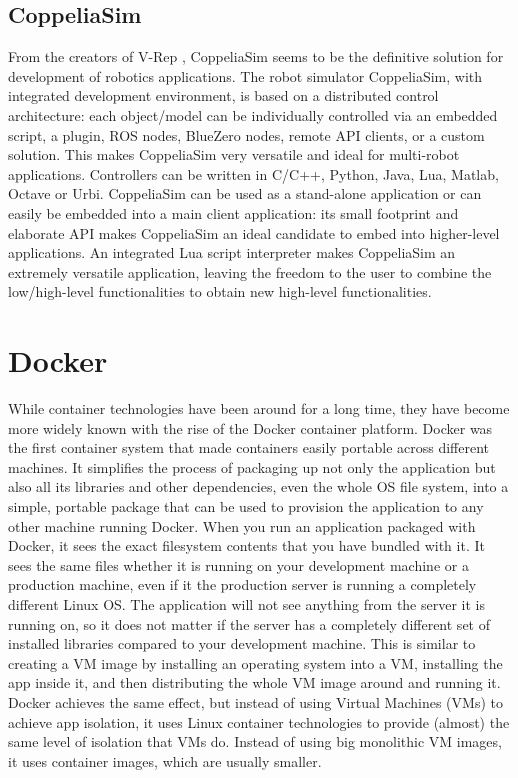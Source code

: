 
\subsection{CoppeliaSim}
From the creators of V-Rep \cite{VREP}, CoppeliaSim \cite{coppeliaSim} seems to be the definitive solution for development of robotics applications.
The robot simulator CoppeliaSim, with integrated development environment, is based on a distributed control architecture: each object/model can be individually controlled via an embedded script, a plugin, ROS nodes, BlueZero nodes, remote API clients, or a custom solution. This makes CoppeliaSim very versatile and ideal for multi-robot applications. Controllers can be written in C/C++, Python, Java, Lua, Matlab, Octave or Urbi.
CoppeliaSim can be used as a stand-alone application or can easily be embedded into a main client application: its small footprint and elaborate API makes CoppeliaSim an ideal candidate to embed into higher-level applications. An integrated Lua script interpreter makes CoppeliaSim an extremely versatile application, leaving the freedom to the user to combine the low/high-level functionalities to obtain new high-level functionalities.




\section{Docker} %
While container technologies have been around for a long time, they have become more widely known with the rise of the Docker container platform. Docker was the first container system that made containers easily portable across different machines. It simplifies the process of packaging up not only the application but also all its libraries and other dependencies, even the whole OS file system, into a simple, portable package that can be used to provision the application to any other machine running Docker. When you run an application packaged with Docker, it sees the exact filesystem contents that you have bundled with it. It sees the same files whether it is running on your development machine or a production machine, even if it the production server is running a completely different Linux OS. The application will not see anything from the server it is running on, so it does not matter if the server has a completely different set of installed libraries compared to your development machine.
This is similar to creating a VM image by installing an operating system into a VM, installing the app inside it, and then distributing the whole VM image around and running it. Docker achieves the same effect, but instead of using Virtual Machines (VMs) to achieve app isolation, it uses Linux container technologies to provide (almost) the same level of isolation that VMs do. Instead of using big monolithic VM images, it uses container images, which are usually smaller.

